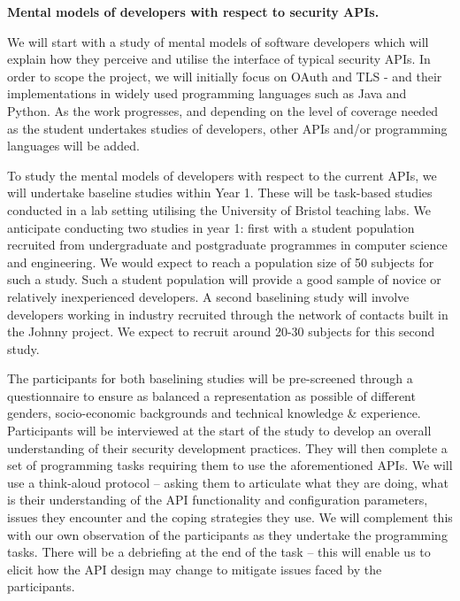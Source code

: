 \documentclass[10pt]{article}
\begin{document}
\begin{description}\itemsep-3pt

\item[WP 1] \textbf{Mental models of developers with respect to security APIs.}

We will start with a study of mental models of software developers which will explain how they perceive and utilise the interface of typical security APIs. In order to scope the project, we will initially focus on OAuth and TLS - and their implementations in widely used programming languages such as Java and Python. As the work progresses, and depending on the level of coverage needed as the student undertakes studies of developers, other APIs and/or programming languages will be added.

To study the mental models of developers with respect to the current APIs, we will undertake baseline studies within Year 1. These will be task-based studies conducted in a lab setting utilising the University of Bristol teaching labs. We anticipate conducting two studies in year 1: first with a student population recruited from undergraduate and postgraduate programmes in computer science and engineering. We would expect to reach a population size of 50 subjects for such a study. Such a student population will provide a good sample of novice or relatively inexperienced developers. A second baselining study will involve developers working in industry recruited through the network of contacts built in the Johnny project. We expect to recruit around 20-30 subjects for this second study.

The participants for both baselining studies will be pre-screened through a questionnaire to ensure as balanced a representation as possible of different genders, socio-economic backgrounds and technical knowledge \& experience. Participants will be interviewed at the start of the study to develop an overall understanding of their security development practices. They will then complete a set of programming tasks requiring them to use the aforementioned APIs. We will use a think-aloud protocol -- asking them to articulate what they are doing, what is their understanding of the API functionality and configuration parameters, issues they encounter and the coping strategies they use. We will complement this with our own observation of the participants as they undertake the programming tasks. There will be a debriefing at the end of the task -- this will enable us to elicit how the API design may change to mitigate issues faced by the participants.


\end{description}
\end{document}
